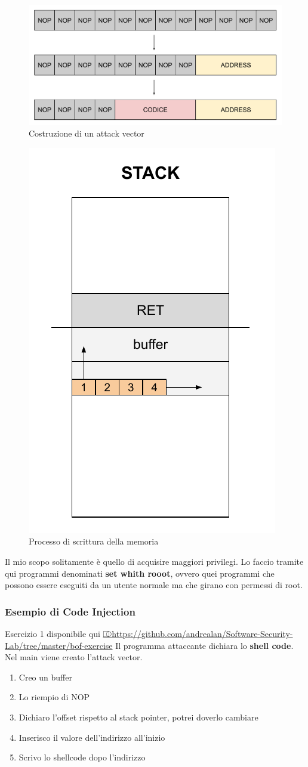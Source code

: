 \documentclass[a4paper,12pt]{article}
\begin{document}
\begin{figure}[H]
	\centering
	\includegraphics[width=0.8\linewidth]{Immagini/AttackV1.pdf}
	\caption{Costruzione di un attack vector}
\end{figure}

\begin{figure}[H]
	\centering
	\includegraphics[width=0.4\linewidth]{Immagini/Stack5.pdf}
	\caption{Processo di scrittura della memoria}
\end{figure}
Il mio scopo solitamente è quello di acquisire maggiori privilegi. Lo faccio tramite qui programmi denominati \textbf{set whith rooot}, ovvero quei programmi che possono essere eseguiti da un utente normale ma che girano con permessi di root.

\subsubsection{Esempio di Code Injection}
Esercizio 1 disponibile qui \url{⎄https://github.com/andrealan/Software-Security-Lab/tree/master/bof-exercise}
Il programma attaccante dichiara lo \textbf{shell code}. Nel main viene creato l'attack vector.
\begin{enumerate}
\item Creo un buffer
\item Lo riempio di NOP
\item Dichiaro l'offset rispetto al stack pointer, potrei doverlo cambiare
\item Inserisco il valore dell'indirizzo all'inizio
\item Scrivo lo shellcode dopo l'indirizzo
\end{enumerate}
\end{document}
